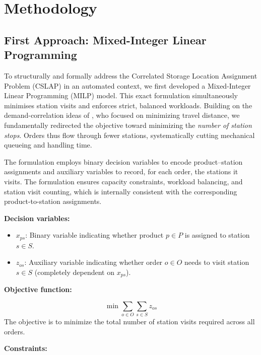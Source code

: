 \documentclass[preprint,review,11pt,authoryear]{elsarticle}
\begin{document}
\section{Methodology}\label{sec:methodology}


\subsection{First Approach: Mixed-Integer Linear Programming}\label{sec:LP_Approach}

To structurally and formally address the Correlated Storage Location Assignment Problem (CSLAP) in an automated context, we first developed a Mixed-Integer Linear Programming (MILP) model. This exact formulation simultaneously minimises station visits and enforces strict, balanced workloads. Building on the demand-correlation ideas of \cite{wang2020}, who focused on minimizing travel distance, we fundamentally redirected the objective toward minimizing the \emph{number of station stops}. Orders thus flow through fewer stations, systematically cutting mechanical queueing and handling time.

The formulation employs binary decision variables to encode product–station assignments and auxiliary variables to record, for each order, the stations it visits. The formulation ensures capacity constraints, workload balancing, and station visit counting, which is internally consistent with the corresponding product-to-station assignments.



\noindent \textbf{Decision variables:}
\begin{itemize}
    \item $x_{ps}$: Binary variable indicating whether product $p \in P$ is assigned to station $s \in S$.
    \item $z_{os}$: Auxiliary variable indicating whether order $o \in O$ needs to visit station $s \in S$ (completely dependent on $x_{ps}$). 

\end{itemize}

\noindent \textbf{Objective function:}

\begin{equation}
\min \sum_{o \in O} \sum_{s \in S} z_{os}
\label{obj}
\end{equation}
The objective is to minimize the total number of station visits required across all orders.

\noindent \textbf{Constraints:}
\end{document}
